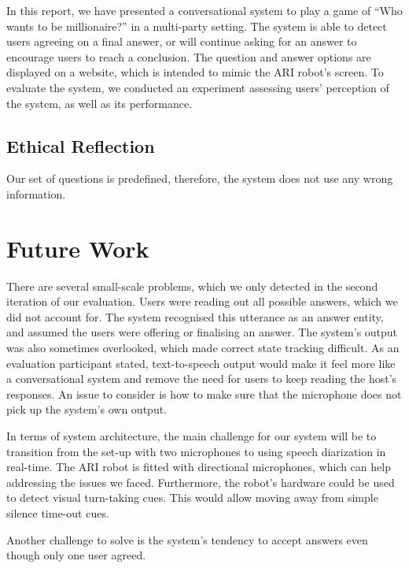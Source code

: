 \documentclass[hidelinks, 11pt]{article}
\begin{document}
In this report, we have presented a conversational system to play a game of ``Who wants to be millionaire?'' in a multi-party setting. The system is able to detect users agreeing on a final answer, or will continue asking for an answer to encourage users to reach a conclusion. The question and answer options are displayed on a website, which is intended to mimic the ARI robot's screen.
To evaluate the system, we conducted an experiment assessing users' perception of the system, as well as its performance.

\subsection{Ethical Reflection}
\label{subsec:ethics}
Our set of questions is predefined, therefore, the system does not use any wrong information.


\section{Future Work}
\label{sec:future_work}

There are several small-scale problems, which we only detected in the second iteration of our evaluation. Users were reading out all possible answers, which we did not account for. The system recognised this utterance as an answer entity, and assumed the users were offering or finalising an answer. The system's output was also sometimes overlooked, which made correct state tracking difficult. As an evaluation participant stated, text-to-speech output would make it feel more like a conversational system and remove the need for users to keep reading the host's responses. An issue to consider is how to make sure that the microphone does not pick up the system's own output.

In terms of system architecture, the main challenge for our system will be to transition from the set-up with two microphones to using speech diarization in real-time. The ARI robot is fitted with directional microphones, which can help addressing the issues we faced. Furthermore, the robot's hardware could be used to detect visual turn-taking cues. This would allow moving away from simple silence time-out cues.

Another challenge to solve is the system's tendency to accept answers even though only one user agreed. %



\end{document}

